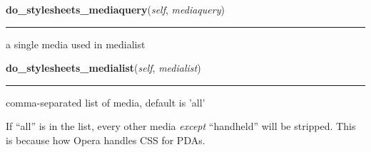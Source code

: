     \label{cssutils:serialize:CSSSerializer:do_stylesheets_mediaquery}

    \vspace{0.5ex}

\hspace{.8\funcindent}\begin{boxedminipage}{\funcwidth}

    \raggedright \textbf{do\_stylesheets\_mediaquery}(\textit{self}, \textit{mediaquery})

    \vspace{-1.5ex}

    \rule{\textwidth}{0.5\fboxrule}
\setlength{\parskip}{2ex}

a single media used in medialist
\setlength{\parskip}{1ex}
    \end{boxedminipage}

    \label{cssutils:serialize:CSSSerializer:do_stylesheets_medialist}

    \vspace{0.5ex}

\hspace{.8\funcindent}\begin{boxedminipage}{\funcwidth}

    \raggedright \textbf{do\_stylesheets\_medialist}(\textit{self}, \textit{medialist})

    \vspace{-1.5ex}

    \rule{\textwidth}{0.5\fboxrule}
\setlength{\parskip}{2ex}

comma-separated list of media, default is 'all'

If ``all'' is in the list, every other media \emph{except} ``handheld'' will
be stripped. This is because how Opera handles CSS for PDAs.
\setlength{\parskip}{1ex}
    \end{boxedminipage}

    \label{cssutils:serialize:CSSSerializer:do_CSSStyleSheet}

